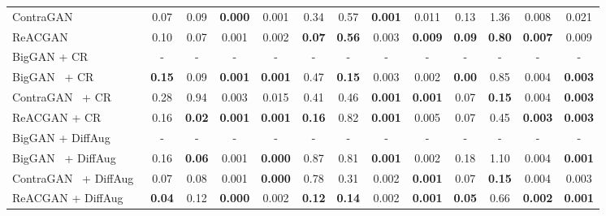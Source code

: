 \documentclass{article}
\begin{document}
\begin{table}[ht]
{\begin{tabular}{lcccccccccccc}
ContraGAN~\cite{kang2020contragan} & 0.07 & 0.09 & \textbf{0.000} & 0.001 & 0.34 & 0.57 & \textbf{0.001} & 0.011 & 0.13 & 1.36 & 0.008 & 0.021 \\
\rowcolor{yellow!20}ReACGAN & 0.10 & 0.07 & 0.001 & 0.002 & \textbf{0.07} & \textbf{0.56} & 0.003 & \textbf{0.009} & \textbf{0.09} & \textbf{0.80} & \textbf{0.007} & 0.009\\
\midrule
BigGAN + CR~\cite{Zhang2019ConsistencyRF} & - & - & - & - & - & - & - & - & - & - & - & -\\
BigGAN~\cite{Brock2019LargeSG} + CR~\cite{Zhang2019ConsistencyRF} & \textbf{0.15} & 0.09 & \textbf{0.001} & \textbf{0.001} & 0.47 & \textbf{0.15} & 0.003 & 0.002 & \textbf{0.00} & 0.85 & 0.004 & \textbf{0.003} \\
ContraGAN~\cite{kang2020contragan} + CR~\cite{Zhang2019ConsistencyRF} & 0.28 & 0.94 & 0.003 & 0.015 & 0.41 & 0.46 & \textbf{0.001} & \textbf{0.001} & 0.07 & \textbf{0.15} & 0.004 & \textbf{0.003} \\
\rowcolor{yellow!20}ReACGAN + CR~\cite{Zhang2019ConsistencyRF} & 0.16 & \textbf{0.02} & \textbf{0.001} & \textbf{0.001} & \textbf{0.16} & 0.82 & \textbf{0.001} & 0.005  & 0.07 & 0.45 & \textbf{0.003} & \textbf{0.003} \\
\midrule
BigGAN + DiffAug~\cite{zhao2020differentiable} & - & - & - & - & - & - & - & - & - & - & - & -\\
BigGAN~\cite{Brock2019LargeSG} + DiffAug~\cite{zhao2020differentiable} & 0.16 & \textbf{0.06} & 0.001 & \textbf{0.000} & 0.87 & 0.81 & \textbf{0.001} & 0.002 & 0.18 & 1.10 & 0.004 & \textbf{0.001} \\
ContraGAN~\cite{kang2020contragan} + DiffAug~\cite{zhao2020differentiable} & 0.07 & 0.08 & 0.001 & \textbf{0.000} & 0.78 & 0.31 & 0.002 & \textbf{0.001} & 0.07 & \textbf{0.15} & 0.004 & 0.003 \\ 
\rowcolor{yellow!20}ReACGAN + DiffAug~\cite{zhao2020differentiable} & \textbf{0.04} & 0.12 & \textbf{0.000} & 0.002 & \textbf{0.12} & \textbf{0.14} & 0.002 & \textbf{0.001} & \textbf{0.05} & 0.66 & \textbf{0.002} & \textbf{0.001}\\
\cmidrule[1.0pt]{1-13}
\end{tabular}}
\end{table}
\end{document}

